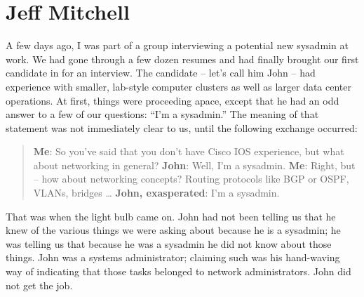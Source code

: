 \chapter{Jeff Mitchell}

A few days ago, I was part of a group interviewing a potential new sysadmin at
work. We had gone through a few dozen resumes and had finally brought our first
candidate in for an interview. The candidate -- let’s call him John -- had
experience with smaller, lab-style computer clusters as well as larger data
center operations. At first, things were proceeding apace, except that he had an
odd answer to a few of our questions: ``I’m a sysadmin.''
The meaning of that statement was not immediately clear to us, until the
following exchange occurred:
\begin{quote}
\textbf{Me}: So you’ve said that you don’t have Cisco IOS experience, but what about
networking in general?\newline
\textbf{John}: Well, I’m a sysadmin.\newline
\textbf{Me}: Right, but -- how about networking concepts? Routing protocols like BGP or
OSPF, VLANs, bridges \dots \newline
\textbf{John, exasperated}: I’m a sysadmin.
\end{quote}
That was when the light bulb came on. John had not been telling us that he knew
of the various things we were asking about because he is a sysadmin; he was
telling us that because he was a sysadmin he did not know about those things.
John was a systems administrator; claiming such was his hand-waving way of
indicating that those tasks belonged to network administrators.
John did not get the job.

